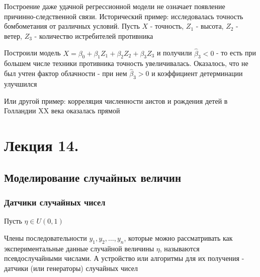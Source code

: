 \documentclass[12pt]{article}
\begin{document}
Построение даже удачной регрессионной модели не означает появление причинно-следственной связи. Исторический пример: исследовалась точность бомбометания от различных условий. Пусть $X$ - точность, $Z_1$ - высота, $Z_2$ - ветер, $Z_3$ - количество истребителей противника

Построили модель $X = \beta_0 + \beta_1 Z_1 + \beta_2 Z_2 + \beta_3 Z_3$ и получили $\hat \beta_3 < 0$ - то есть при большем числе техники противника точность увеличивалась. Оказалось, что не был учтен фактор облачности - при нем $\hat \beta_3 > 0$ и коэффициент детерминации улучшился

Или другой пример: корреляция численности аистов и рождения детей в Голландии XX века оказалась прямой






\section{Лекция 14.}

\subsection{Моделирование случайных величин}

\subsubsection{Датчики случайных чисел}

Пусть $\eta \in U(0, 1)$

\Def Члены последовательности $y_1, y_2, \dots, y_n$, которые можно рассматривать как экспериментальные данные случайной величины $\eta$, называются псевдослучайными числами. А устройство или алгоритмы для их получения - датчики (или генераторы) случайных чисел
\end{document}
